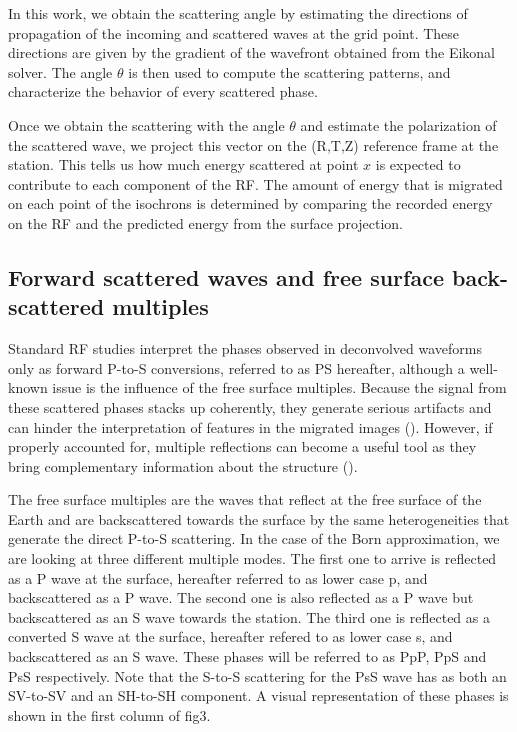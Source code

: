 \documentclass[10pt,a4paper]{article}
\numberwithin{equation}{section}
\begin{document}
In this work, we obtain the scattering angle by estimating the directions of propagation of the incoming and scattered waves at the grid point.
These directions are given by the gradient of the wavefront obtained from the Eikonal solver.
The angle $\theta$ is then used to compute the scattering patterns, and characterize the behavior of every scattered phase.

Once we obtain the scattering with the angle $\theta$ and estimate the polarization of the scattered wave, we project this vector on the (R,T,Z) reference frame at the station.
This tells us how much energy scattered at point $x$ is expected to contribute to each component of the RF.
The amount of energy that is migrated on each point of the isochrons is determined by comparing the recorded energy on the RF and the predicted energy from the surface projection.

\subsection{Forward scattered waves and free surface back-scattered multiples}

Standard RF studies interpret the phases observed in deconvolved waveforms only as forward P-to-S conversions, referred to as PS hereafter, although a well-known issue is the influence of the free surface multiples.
Because the signal from these scattered phases stacks up coherently, they generate serious artifacts and can hinder the interpretation of features in the migrated images (\cite{cheng_grl_17}).
However, if properly accounted for, multiple reflections can become a useful tool as they bring complementary information about the structure (\cite{tauz_epsl_16}). 

The free surface multiples are the waves that reflect at the free surface of the Earth and are backscattered towards the surface by the same heterogeneities that generate the direct P-to-S scattering.
In the case of the Born approximation, we are looking at three different multiple modes.
The first one to arrive is reflected as a P wave at the surface, hereafter referred to as lower case p, and backscattered as a P wave.
The second one is also reflected as a P wave but backscattered as an S wave towards the station.
The third one is reflected as a converted S wave at the surface, hereafter refered to as lower case s, and backscattered as an S wave.
These phases will be referred to as PpP, PpS and PsS respectively.
Note that the S-to-S scattering for the PsS wave has as both an SV-to-SV and an SH-to-SH component.
A visual representation of these phases is shown in the first column of fig3.
\end{document}
